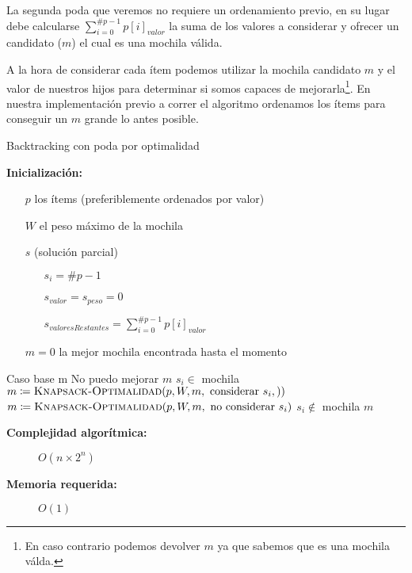 \documentclass[fleqn, 11pt]{article}
\def\is{\coloneqq}
\begin{document}
La segunda poda que veremos no requiere un ordenamiento previo, en su lugar
debe calcularse $\sum_{i = 0}^{\#p - 1}p[i]_{valor}$ la suma de los valores a
considerar y ofrecer un candidato ($m$) el cual es una mochila válida.

A la hora de considerar cada ítem podemos utilizar la mochila candidato $m$ y
el valor de nuestros hijos para determinar si somos capaces de
mejorarla\footnote{En caso contrario podemos devolver $m$ ya que sabemos que es
una mochila válda.}. En nuestra implementación previo a correr el algoritmo
ordenamos los ítems para conseguir un $m$ grande lo antes posible.

\begin{algorithm}
\caption{Backtracking con poda por optimalidad}
\begin{algorithmic}[1]
\item[\textbf{Inicialización:}]
\item[] \begin{itemize}
	\item[] $p$ los ítems (preferiblemente ordenados por valor)
	\item[] $W$ el peso máximo de la mochila
	\item[] $s$ (solución parcial)
	\begin{itemize}
		\item[] $s_i = \#p - 1$
		\item[] $s_{valor} = s_{peso} = 0$
		\item[] $s_{valoresRestantes} = \sum_{i = 0}^{\#p - 1} p[i]_{valor}$
	\end{itemize}
	\item[] $m = 0$ la mejor mochila encontrada hasta el momento
\end{itemize}
\Statex
{}
	\Comment Caso base
	\State \Return m
\EndIf
{}
	\Comment No puedo mejorar
	\State \Return $m$
\EndIf
{}
	\Comment $s_i \in$ mochila
	\State $m \is \Call{Knapsack-Optimalidad}{p,W,m, \text{ considerar } s_i,)}$
\EndIf
\State $m \is \Call{Knapsack-Optimalidad}{p,W,m, \text{ no considerar } s_i}$
\Comment $s_i \not\in$ mochila
\State \Return $m$
\EndFunction
\end{algorithmic}
\begin{description}
	\item[\textbf{Complejidad algorítmica:}] $O(n \times 2^n)$
	\item[\textbf{Memoria requerida:}] $O(1)$
\end{description}
\end{algorithm}
\end{document}
